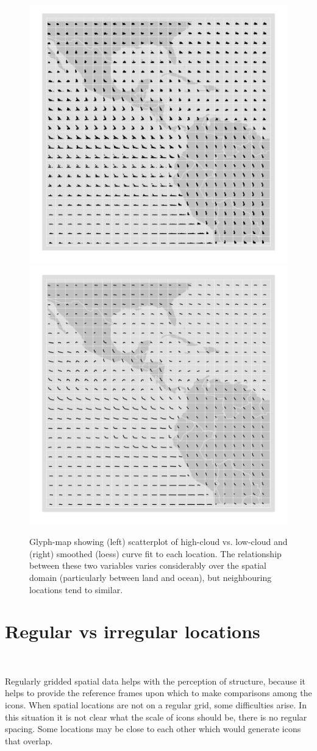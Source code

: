 \documentclass[oneside]{article}
\begin{document}
\begin{figure}[htbp]
  \centering
  \includegraphics[width=0.5\linewidth]{clouds}%
  \includegraphics[width=0.5\linewidth]{clouds-smooth}

  \caption{Glyph-map showing (left) scatterplot of high-cloud vs. low-cloud and (right) smoothed (loess) curve fit to each location. The relationship between these two variables varies considerably over the spatial domain (particularly between land and ocean), but neighbouring locations tend to similar. }
  \label{fig:cloud}
\end{figure}

\section{Regular vs irregular locations}~\label{sec:irregular}

Regularly gridded spatial data helps with the perception of structure, because it helps to provide the reference frames upon which to make comparisons among the icons. When spatial locations are not on a regular grid, some difficulties arise. In this situation it is not clear what the scale of icons should be, there is no regular spacing. Some locations may be close to each other which would generate icons that overlap. 
\end{document}
